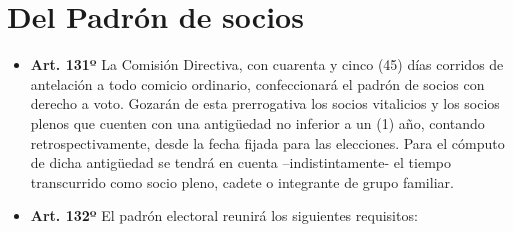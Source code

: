 \documentclass[]{book}
\begin{document}
\section{Del Padrón de socios}\label{del-padron-de-socios}

\begin{itemize}
\item
  \textbf{Art. 131º} La Comisión Directiva, con cuarenta y cinco (45)
  días corridos de antelación a todo comicio ordinario, confeccionará el
  padrón de socios con derecho a voto. Gozarán de esta prerrogativa los
  socios vitalicios y los socios plenos que cuenten con una antigüedad
  no inferior a un (1) año, contando retrospectivamente, desde la fecha
  fijada para las elecciones. Para el cómputo de dicha antigüedad se
  tendrá en cuenta --indistintamente- el tiempo transcurrido como socio
  pleno, cadete o integrante de grupo familiar.
\item
  \textbf{Art. 132º} El padrón electoral reunirá los siguientes
  requisitos:


\end{itemize}
\end{document}
